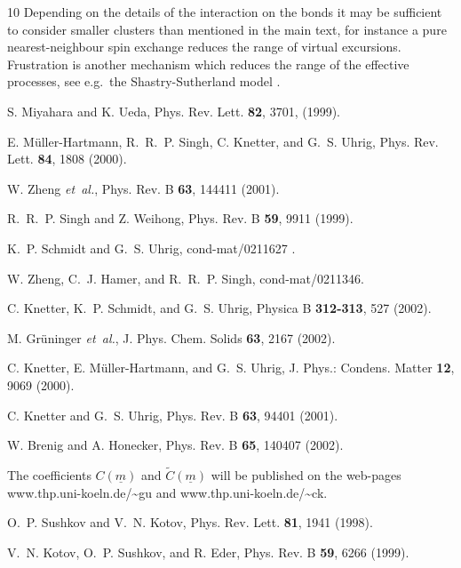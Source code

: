 \begin{thebibliography}{10}
Depending on the details of the interaction on
the bonds it may be sufficient to consider smaller
clusters than mentioned in the main text, for
instance a pure nearest-neighbour spin exchange
reduces the range of virtual excursions. Frustration is another
mechanism which reduces the range of the effective processes, see
e.g.\ the Shastry-Sutherland model
\protect\cite{knett00b,miyah99,mulle00a}.

S. Miyahara and K. Ueda, Phys. Rev. Lett. {\bf 82}, {3701}, (1999).

E. M\"uller-Hartmann, R.~R.~P. Singh, C. Knetter, and G.~S. Uhrig, Phys. Rev.
  Lett. {\bf 84},  1808  (2000).
  
W. Zheng {\it et~al.}, Phys. Rev. B {\bf 63},  144411  (2001).

R.~R.~P. Singh and Z. Weihong, Phys. Rev. B {\bf 59},  9911  (1999).

K.~P. Schmidt and G.~S. Uhrig, cond-mat/0211627 .

W. Zheng, C.~J. Hamer, and R.~R.~P. Singh, cond-mat/0211346.

C. Knetter, K.~P. Schmidt, and G.~S. Uhrig, Physica B {\bf 312-313},  527
  (2002).

M. Gr\"uninger {\it et~al.}, J. Phys. Chem. Solids {\bf 63},  2167  (2002).

C. Knetter, E. M\"uller-Hartmann, and G.~S. Uhrig, J. Phys.: Condens. Matter
  {\bf 12},  9069  (2000).

C. Knetter and G.~S. Uhrig, Phys. Rev. B {\bf 63},  94401  (2001).

W. Brenig and A. Honecker, Phys. Rev. B {\bf 65},  140407  (2002).

The coefficients $C(\underline{m})$ and $\tilde C(\underline{m})$
will be published on the web-pages 
www.thp.uni-koeln.de/\~{}gu and www.thp.uni-koeln.de/\~{}ck.

O.~P. Sushkov and V.~N. Kotov, Phys. Rev. Lett. {\bf 81},  1941  (1998).

V.~N. Kotov, O.~P. Sushkov, and R. Eder, Phys. Rev. B {\bf 59},  6266  (1999).

\end{thebibliography}




